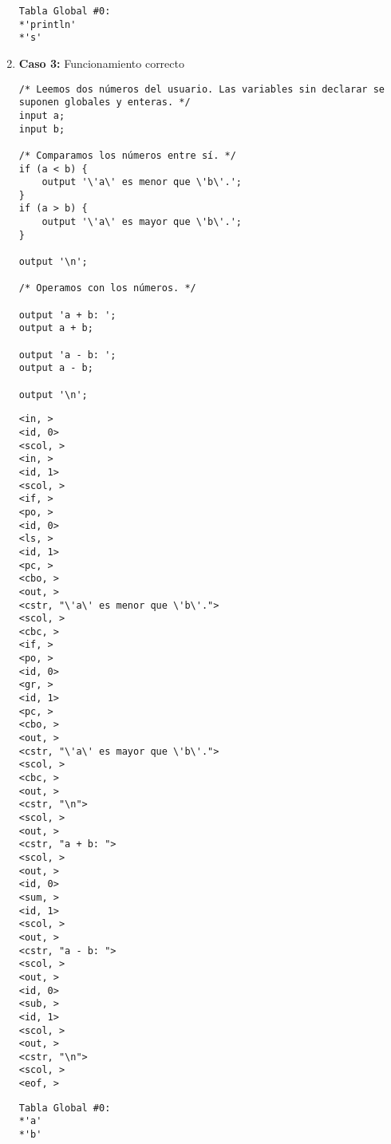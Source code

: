 \begin{enumerate}
    \begin{tcolorbox}[title={Volcado del fichero de la tabla de símbolos}, colback=white]
        \begin{lstlisting}
Tabla Global #0:
*'println'
*'s'
        \end{lstlisting}
    \end{tcolorbox}


    \item \textbf{Caso 3:} Funcionamiento correcto
    \begin{tcolorbox}[title={Código fuente}, colback=white]
        \begin{lstlisting}
/* Leemos dos números del usuario. Las variables sin declarar se suponen globales y enteras. */
input a;
input b;

/* Comparamos los números entre sí. */
if (a < b) {
    output '\'a\' es menor que \'b\'.';
}
if (a > b) {
    output '\'a\' es mayor que \'b\'.';
}

output '\n';

/* Operamos con los números. */

output 'a + b: ';
output a + b;

output 'a - b: ';
output a - b;

output '\n';
        \end{lstlisting}        
    \end{tcolorbox}

    \begin{tcolorbox}[title={Volcado del fichero de tokens}, colback=white]
        \begin{lstlisting}
<in, >
<id, 0>
<scol, >
<in, >
<id, 1>
<scol, >
<if, >
<po, >
<id, 0>
<ls, >
<id, 1>
<pc, >
<cbo, >
<out, >
<cstr, "\'a\' es menor que \'b\'.">
<scol, >
<cbc, >
<if, >
<po, >
<id, 0>
<gr, >
<id, 1>
<pc, >
<cbo, >
<out, >
<cstr, "\'a\' es mayor que \'b\'.">
<scol, >
<cbc, >
<out, >
<cstr, "\n">
<scol, >
<out, >
<cstr, "a + b: ">
<scol, >
<out, >
<id, 0>
<sum, >
<id, 1>
<scol, >
<out, >
<cstr, "a - b: ">
<scol, >
<out, >
<id, 0>
<sub, >
<id, 1>
<scol, >
<out, >
<cstr, "\n">
<scol, >
<eof, >
        \end{lstlisting}
    \end{tcolorbox}

    \begin{tcolorbox}[title={Volcado del fichero de la tabla de símbolos}, colback=white]
        \begin{lstlisting}
Tabla Global #0:
*'a'
*'b'
        \end{lstlisting}
    \end{tcolorbox}


\end{enumerate}
